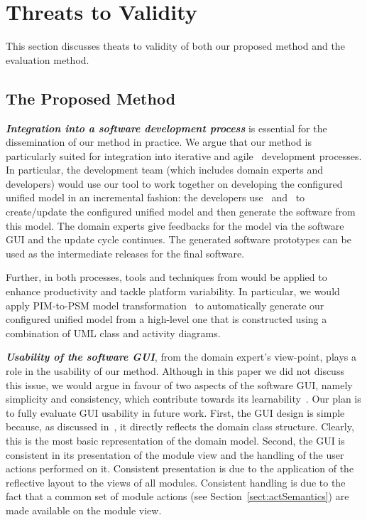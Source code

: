 \section{Threats to Validity} \label{sect:threats}
This section discusses theats to validity of both our proposed method and the evaluation method.

\subsection{The Proposed Method}

\textbf{\textit{Integration into a software development process}} is essential for the dissemination of our method in practice. We argue that our method is particularly suited for integration into iterative \cite{larman_applying_2004} and agile~\cite{beck_manifesto_2017} development processes. In particular, the development team (which includes domain experts and developers) would use our tool to work together on developing the configured unified model in an incremental fashion: the developers use \dcsl~and \agl~to create/update the configured unified model and then generate the software from this model. The domain experts give feedbacks for the model via the software GUI and the update cycle continues. The generated software prototypes can be used as the intermediate releases for the final software.

Further, in both processes, tools and techniques from  would be applied to enhance productivity and tackle platform variability. In particular, we would apply PIM-to-PSM model transformation~\cite{kent_model_2002,brambilla_model-driven_2012} to automatically generate our configured unified model from a high-level one that is constructed using a combination of UML class and activity diagrams.

\textbf{\textit{Usability of the software GUI}}, from the domain expert's view-point, plays a role in the usability of our method. Although in this paper we did not discuss this issue, we would argue in favour of two aspects of the software GUI, namely simplicity and consistency, which contribute towards its learnability~\cite{folmer_architecting_2004}. Our plan is to fully evaluate GUI usability in future work. First, the GUI design is simple because, as discussed in~\cite{le_domain_2018}, it directly reflects the domain class structure. Clearly, this is the most basic representation of the domain model. Second, the GUI is consistent in its presentation of the module view and the handling of the user actions performed on it. Consistent presentation is due to the application of the reflective layout to the views of all modules. Consistent handling is due to the fact that a common set of module actions (see Section~\ref{sect:actSemantics}) are made available on the module view.

